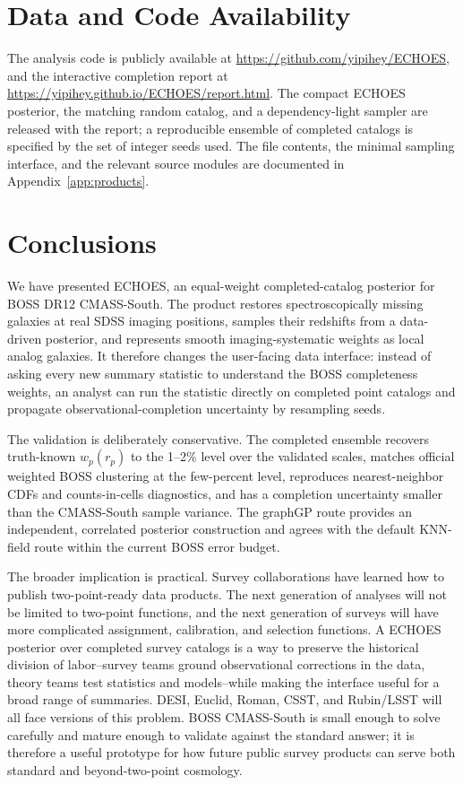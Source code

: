 \documentclass[apj]{emulateapj}
\begin{document}
\section{Data and Code Availability}
\label{sec:availability}

The analysis code is publicly available at
\url{https://github.com/yipihey/ECHOES}, and the interactive
completion report at
\url{https://yipihey.github.io/ECHOES/report.html}.  The compact
ECHOES posterior, the matching random catalog, and a dependency-light sampler
are released with the report; a reproducible ensemble of completed catalogs is
specified by the set of integer seeds used.  The file contents, the minimal
sampling interface, and the relevant source modules are documented in
Appendix~\ref{app:products}.

\section{Conclusions}
\label{sec:conclusions}

We have presented \textsc{ECHOES}, an equal-weight completed-catalog posterior
for BOSS DR12 CMASS-South.  The product restores spectroscopically missing
galaxies at real SDSS imaging positions, samples their redshifts from a
data-driven posterior, and represents smooth imaging-systematic weights as
local analog galaxies.  It
therefore changes the user-facing data interface: instead of asking every new
summary statistic to understand the BOSS completeness weights, an analyst can
run the statistic directly on completed point catalogs and propagate
observational-completion uncertainty by resampling seeds.

The validation is deliberately conservative.  The completed ensemble recovers
truth-known $w_p(r_p)$ to the 1--2\% level over the validated scales, matches
official weighted BOSS clustering at the few-percent level, reproduces
nearest-neighbor CDFs and counts-in-cells diagnostics, and has a completion
uncertainty smaller than the CMASS-South sample variance.  The graphGP route
provides an independent, correlated posterior construction and agrees with the
default KNN-field route within the current BOSS error budget.

The broader implication is practical.  Survey collaborations have learned how
to publish two-point-ready data products.  The next generation of analyses will
not be limited to two-point functions, and the next generation of surveys will
have more complicated assignment, calibration, and selection functions.  A
ECHOES posterior over completed survey catalogs is a way to preserve the historical
division of labor--survey teams ground observational corrections in the data,
theory teams test statistics and models--while making the interface useful for a
broad range of summaries.  DESI, Euclid, Roman, CSST, and Rubin/LSST will all face
versions of this problem.  BOSS CMASS-South is small enough to solve carefully
and mature enough to validate against the standard answer; it is therefore a
useful prototype for how future public survey products can serve both standard
and beyond-two-point cosmology.
\end{document}
